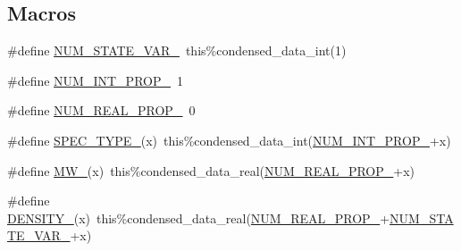 \subsection*{Macros}
\begin{DoxyCompactItemize}
\item 
\#define \mbox{\hyperlink{aero__phase__data_8_f90_a5b96d96acf980c9d12118897b1cf8585}{N\+U\+M\+\_\+\+S\+T\+A\+T\+E\+\_\+\+V\+A\+R\+\_\+}}~this\%condensed\+\_\+data\+\_\+int(1)
\item 
\#define \mbox{\hyperlink{aero__phase__data_8_f90_a13ba1b28e3d8a5e60eec52ce6bbabe4f}{N\+U\+M\+\_\+\+I\+N\+T\+\_\+\+P\+R\+O\+P\+\_\+}}~1
\item 
\#define \mbox{\hyperlink{aero__phase__data_8_f90_aa9808eb54fa06bcf890dd1aa1fc6ca5b}{N\+U\+M\+\_\+\+R\+E\+A\+L\+\_\+\+P\+R\+O\+P\+\_\+}}~0
\item 
\#define \mbox{\hyperlink{aero__phase__data_8_f90_a5abfc86c868793576be1eb6acec4d966}{S\+P\+E\+C\+\_\+\+T\+Y\+P\+E\+\_\+}}(x)~this\%condensed\+\_\+data\+\_\+int(\mbox{\hyperlink{rxn__arrhenius_8_f90_a13ba1b28e3d8a5e60eec52ce6bbabe4f}{N\+U\+M\+\_\+\+I\+N\+T\+\_\+\+P\+R\+O\+P\+\_\+}}+x)
\item 
\#define \mbox{\hyperlink{aero__phase__data_8_f90_a533cad7ef28f4059577d632870ed98d7}{M\+W\+\_\+}}(x)~this\%condensed\+\_\+data\+\_\+real(\mbox{\hyperlink{rxn__arrhenius_8_f90_aa9808eb54fa06bcf890dd1aa1fc6ca5b}{N\+U\+M\+\_\+\+R\+E\+A\+L\+\_\+\+P\+R\+O\+P\+\_\+}}+x)
\item 
\#define \mbox{\hyperlink{aero__phase__data_8_f90_a43a841814e566347ca15f79747286d39}{D\+E\+N\+S\+I\+T\+Y\+\_\+}}(x)~this\%condensed\+\_\+data\+\_\+real(\mbox{\hyperlink{rxn__arrhenius_8_f90_aa9808eb54fa06bcf890dd1aa1fc6ca5b}{N\+U\+M\+\_\+\+R\+E\+A\+L\+\_\+\+P\+R\+O\+P\+\_\+}}+\mbox{\hyperlink{aero__phase__solver_8c_a5b96d96acf980c9d12118897b1cf8585}{N\+U\+M\+\_\+\+S\+T\+A\+T\+E\+\_\+\+V\+A\+R\+\_\+}}+x)
\end{DoxyCompactItemize}
